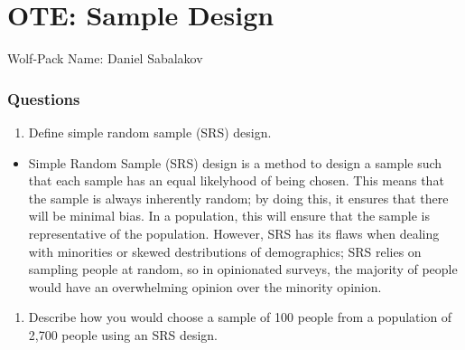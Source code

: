 \documentclass[letterpaper]{article}
\def\tightlist{}
\newcommand{\titleDOC}{}
\newcommand{\authorDOC}{Daniel Sabalakov}
\newcommand{\classDOC}{}
\newcommand{\quoteDOC}{``\textit{Truth is ever to be found in the simplicity, and not in the multiplicity and confusion of things}'' - Issac Newton}
\begin{document}








\renewcommand{\classDOC}{DE Intro to Statistics I}

\renewcommand{\quoteDOC}{``\textit{For the strength of the pack is the wolf, and the strength of the wolf is the pack}''}

\renewcommand{\authorDOC}{Daniel Sabalakov}

\renewcommand{\titleDOC}{OTE Sample Design}



\section{OTE: Sample Design}\label{ote-sample-design}

Wolf-Pack Name: Daniel Sabalakov

\subsubsection{Questions}\label{questions}

\begin{enumerate}
\def\labelenumi{(\alph{enumi})}
\tightlist
\item
  Define simple random sample (SRS) design.\\
\end{enumerate}

\begin{itemize}
\tightlist
\item
  Simple Random Sample (SRS) design is a method to design a sample such that each sample has an equal likelyhood of being chosen. This means that the sample is always inherently random; by doing this, it ensures that there will be minimal bias. In a population, this will ensure that the sample is representative of the population. However, SRS has its flaws when dealing with minorities or skewed destributions of demographics; SRS relies on sampling people at random, so in opinionated surveys, the majority of people would have an overwhelming opinion over the minority opinion.
\end{itemize}

\begin{enumerate}
\def\labelenumi{(\alph{enumi})}
\setcounter{enumi}{1}
\tightlist
\item
  Describe how you would choose a sample of 100 people from a population of 2,700 people using an SRS design.
\end{enumerate}
\end{document}
